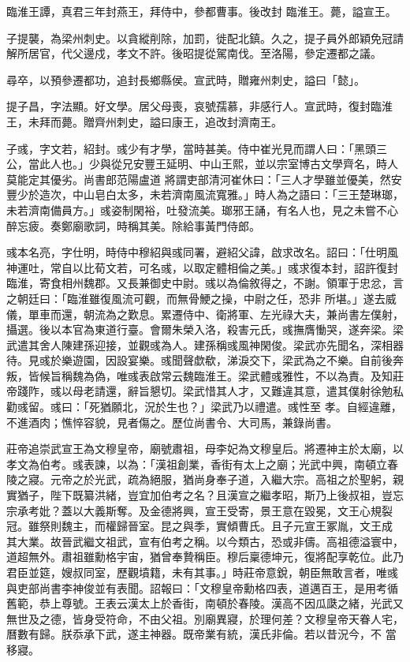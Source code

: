 \begin{pinyinscope}
 臨淮王譚，真君三年封燕王，拜侍中，參都曹事。後改封
 臨淮王。薨，謚宣王。



 子提襲，為梁州刺史。以貪縱削除，加罰，徙配北鎮。久之，提子員外郎穎免冠請解所居官，代父邊戍，孝文不許。後昭提從駕南伐。至洛陽，參定遷都之議。



 尋卒，以預參遷都功，追封長鄉縣侯。宣武時，贈雍州刺史，謚曰「懿」。



 提子昌，字法顯。好文學。居父母喪，哀號孺慕，非感行人。宣武時，復封臨淮王，未拜而薨。贈齊州刺史，謚曰康王，追改封濟南王。



 子彧，字文若，紹封。彧少有才學，當時甚美。侍中崔光見而謂人曰：「黑頭三公，當此人也。」少與從兄安豐王延明、中山王熙，並以宗室博古文學齊名，時人莫能定其優劣。尚書郎范陽盧道
 將謂吏部清河崔休曰：「三人才學雖並優美，然安豐少於造次，中山皂白太多，未若濟南風流寬雅。」時人為之語曰：「三王楚琳瑯，未若濟南備員方。」彧姿制閑裕，吐發流美。瑯邪王誦，有名人也，見之未嘗不心醉忘疲。奏鄭廟歌詞，時稱其美。除給事黃門侍郎。



 彧本名亮，字仕明，時侍中穆紹與彧同署，避紹父諱，啟求改名。詔曰：「仕明風神運吐，常自以比荀文若，可名彧，以取定體相倫之美。」彧求復本封，詔許復封臨淮，寄食相州魏郡。又長兼御史中尉。彧以為倫敘得之，不謝。領軍于忠忿，言之朝廷曰：「臨淮雖復風流可觀，而無骨鯁之操，中尉之任，恐非
 所堪。」遂去威儀，單車而還，朝流為之歎息。累遷侍中、衛將軍、左光祿大夫，兼尚書左僕射，攝選。後以本官為東道行臺。會爾朱榮入洛，殺害元氏，彧撫膺慟哭，遂奔梁。梁武遣其舍人陳建孫迎接，並觀彧為人。建孫稱彧風神閑俊。梁武亦先聞名，深相器待。見彧於樂遊園，因設宴樂。彧聞聲歔欷，涕淚交下，梁武為之不樂。自前後奔叛，皆候旨稱魏為偽，唯彧表啟常云魏臨淮王。梁武體彧雅性，不以為責。及知莊帝踐阼，彧以母老請還，辭旨懇切。梁武惜其人才，又難違其意，遣其僕射徐勉私勸彧留。彧曰：「死猶願北，況於生也？」梁武乃以禮遣。彧性至
 孝。自經違離，不進酒肉；憔悴容貌，見者傷之。歷位尚書令、大司馬，兼錄尚書。



 莊帝追崇武宣王為文穆皇帝，廟號肅祖，母李妃為文穆皇后。將遷神主於太廟，以孝文為伯考。彧表諫，以為：「漢祖創業，香街有太上之廟；光武中興，南頓立春陵之寢。元帝之於光武，疏為絕服，猶尚身奉子道，入繼大宗。高祖之於聖躬，親實猶子，陛下既纂洪緒，豈宜加伯考之名？且漢宣之繼孝昭，斯乃上後叔祖，豈忘宗承考妣？蓋以大義斯奪。及金德將興，宣王受寄，景王意在毀冕，文王心規裂冠。雖祭則魏主，而權歸晉室。昆之與季，實傾曹氏。且子元宣王冢胤，文王成
 其大業。故晉武繼文祖武，宣有伯考之稱。以今類古，恐或非儔。高祖德溢寰中，道超無外。肅祖雖勳格宇宙，猶曾奉贄稱臣。穆后稟德坤元，復將配享乾位。此乃君臣並筵，嫂叔同室，歷觀墳籍，未有其事。」時莊帝意銳，朝臣無敢言者，唯彧與吏部尚書李神俊並有表聞。詔報曰：「文穆皇帝勳格四表，道邁百王，是用考循舊範，恭上尊號。王表云漢太上於香街，南頓於春陵。漢高不因瓜瓞之緒，光武又無世及之德，皆身受符命，不由父祖。別廟異寢，於理何差？文穆皇帝天眷人宅，曆數有歸。朕忝承下武，遂主神器。既帝業有統，漢氏非倫。若以昔況今，不
 當移寢。




\end{pinyinscope}
